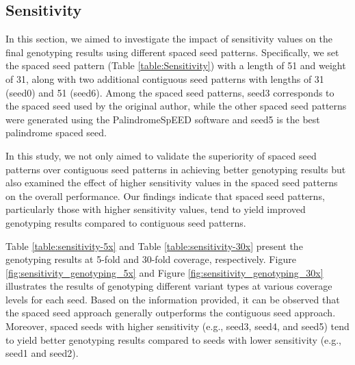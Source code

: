 \documentclass{PHlab-thesis}
\begin{document}
\subsection{Sensitivity}
In this section, we aimed to investigate the impact of sensitivity values on the final genotyping results using different spaced seed patterns. Specifically, we set the spaced seed pattern (Table \ref{table:Sensitivity}) with a length of 51 and weight of 31, along with two additional contiguous seed patterns with lengths of 31 (seed0) and 51 (seed6). Among the spaced seed patterns, seed3 corresponds to the spaced seed used by the original author, while the other spaced seed patterns were generated using the PalindromeSpEED software and seed5 is the best palindrome spaced seed.

In this study, we not only aimed to validate the superiority of spaced seed patterns over contiguous seed patterns in achieving better genotyping results but also examined the effect of higher sensitivity values in the spaced seed patterns on the overall performance. Our findings indicate that spaced seed patterns, particularly those with higher sensitivity values, tend to yield improved genotyping results compared to contiguous seed patterns.

Table \ref{table:sensitivity-5x} and Table \ref{table:sensitivity-30x} present the genotyping results at 5-fold and 30-fold coverage, respectively. Figure \ref{fig:sensitivity_genotyping_5x} and Figure \ref{fig:sensitivity_genotyping_30x} illustrates the results of genotyping different variant types at various coverage levels for each seed. Based on the information provided, it can be observed that the spaced seed approach generally outperforms the contiguous seed approach. Moreover, spaced seeds with higher sensitivity (e.g., seed3, seed4, and seed5) tend to yield better genotyping results compared to seeds with lower sensitivity (e.g., seed1 and seed2).
\end{document}
